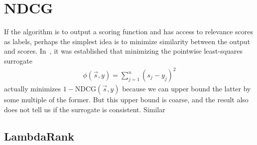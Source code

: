 \section{NDCG}
\label{sec:ndcg}
If the algorithm is to output a scoring function and has access to relevance
scores as labels, perhaps the simplest idea is to minimize similarity between
the output and scores. In~\cite{bayes-optimal-subset-ranking}, it was
established that minimizing the pointwise least-squares surrogate
\begin{align*}
  \phi(\vec{s}, y) = \sum_{j=1}^n {(s_j - y_j)}^2
\end{align*}
actually minimizes $1 - \text{NDCG}(\vec{s}, y)$ because we can upper bound
the latter by some multiple of the former. But this upper bound is coarse,
and the result also does not tell us if the surrogate is consistent. 
Similar 



\subsection{LambdaRank}
